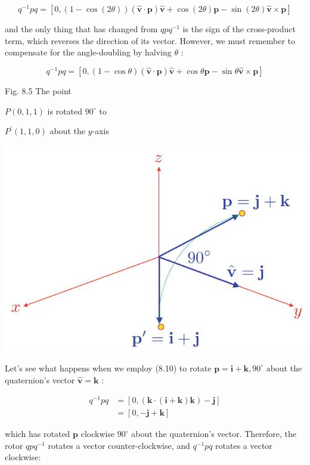 \documentclass[10pt]{article}
\begin{document}
$$
q^{-1} p q=[0,(1-\cos (2 \theta))(\hat{\mathbf{v}} \cdot \mathbf{p}) \hat{\mathbf{v}}+\cos (2 \theta) \mathbf{p}-\sin (2 \theta) \hat{\mathbf{v}} \times \mathbf{p}]
$$

and the only thing that has changed from $q p q^{-1}$ is the sign of the cross-product term, which reverses the direction of its vector. However, we must remember to compensate for the angle-doubling by halving $\theta$ :

$$
q^{-1} p q=[0,(1-\cos \theta)(\hat{\mathbf{v}} \cdot \mathbf{p}) \hat{\mathbf{v}}+\cos \theta \mathbf{p}-\sin \theta \hat{\mathbf{v}} \times \mathbf{p}]
$$

Fig. 8.5 The point

$P(0,1,1)$ is rotated $90^{\circ}$ to

$P^{\prime}(1,1,0)$ about the $y$-axis

\begin{center}
\includegraphics[max width=\textwidth]{2023_04_20_41f1ceac5a31dc7d1b59g-149}
\end{center}

Let's see what happens when we employ (8.10) to rotate $\mathbf{p}=\mathbf{i}+\mathbf{k}, 90^{\circ}$ about the quaternion's vector $\hat{\mathbf{v}}=\mathbf{k}$ :

$$
\begin{aligned}
q^{-1} p q & =[0,(\mathbf{k} \cdot(\mathbf{i}+\mathbf{k}) \mathbf{k})-\mathbf{j}] \\
& =[0,-\mathbf{j}+\mathbf{k}]
\end{aligned}
$$

which has rotated $\mathbf{p}$ clockwise $90^{\circ}$ about the quaternion's vector. Therefore, the rotor $q p q^{-1}$ rotates a vector counter-clockwise, and $q^{-1} p q$ rotates a vector clockwise:
\end{document}
